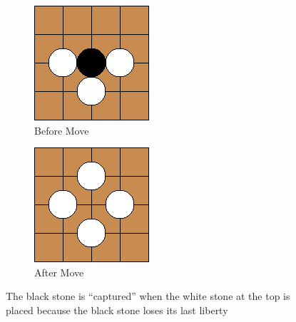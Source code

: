 \documentclass{l4proj}
\begin{document}
\begin{figure}[!ht]
\centering
\begin{subfigure}[b]{0.25\textwidth}
\includegraphics[width=\textwidth]{ex/Ex1-0.png}
\caption{Before Move}
\label{fig:ex1-0}
\end{subfigure} \qquad\qquad\qquad
\begin{subfigure}[b]{0.25\textwidth}
\includegraphics[width=\textwidth]{ex/Ex1-1.png}
\caption{After Move}
\label{fig:ex1-1}
\end{subfigure}
\caption{The black stone is “captured” when the white stone at the top is placed because the black stone loses its last liberty}
\label{fig:ex1}
\end{figure}
\end{document}
